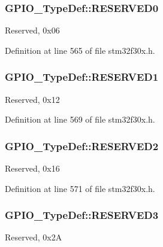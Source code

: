 \hypertarget{struct_g_p_i_o___type_def_a23e4eb7429215d8513434000a04fc264}{
\subsubsection[{R\-E\-S\-E\-R\-V\-E\-D0}]{ G\-P\-I\-O\-\_\-\-Type\-Def\-::\-R\-E\-S\-E\-R\-V\-E\-D0}}\label{struct_g_p_i_o___type_def_a23e4eb7429215d8513434000a04fc264}
Reserved, 0x06 

Definition at line 565 of file stm32f30x.\-h.

\hypertarget{struct_g_p_i_o___type_def_a6873e6635592f8ecd30ad73fe3301225}{
\subsubsection[{R\-E\-S\-E\-R\-V\-E\-D1}]{ G\-P\-I\-O\-\_\-\-Type\-Def\-::\-R\-E\-S\-E\-R\-V\-E\-D1}}\label{struct_g_p_i_o___type_def_a6873e6635592f8ecd30ad73fe3301225}
Reserved, 0x12 

Definition at line 569 of file stm32f30x.\-h.

\hypertarget{struct_g_p_i_o___type_def_a67d9355cb52b179d1d34e860a6750a8a}{
\subsubsection[{R\-E\-S\-E\-R\-V\-E\-D2}]{ G\-P\-I\-O\-\_\-\-Type\-Def\-::\-R\-E\-S\-E\-R\-V\-E\-D2}}\label{struct_g_p_i_o___type_def_a67d9355cb52b179d1d34e860a6750a8a}
Reserved, 0x16 

Definition at line 571 of file stm32f30x.\-h.

\hypertarget{struct_g_p_i_o___type_def_a0d4f86adb13774488d491504df642e3c}{
\subsubsection[{R\-E\-S\-E\-R\-V\-E\-D3}]{ G\-P\-I\-O\-\_\-\-Type\-Def\-::\-R\-E\-S\-E\-R\-V\-E\-D3}}\label{struct_g_p_i_o___type_def_a0d4f86adb13774488d491504df642e3c}
Reserved, 0x2\-A 

